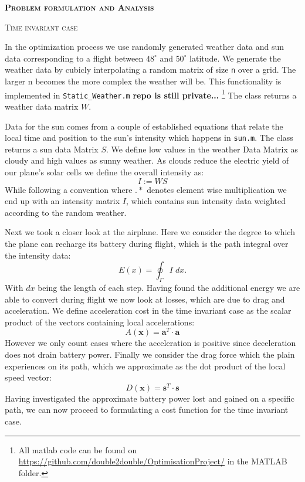 \documentclass[10pt,a4paper]{article}
\newenvironment{buik}
{\begin{multicols}{3}}
{\end{multicols}}
\renewcommand{\section}[1]{%
    \par\vspace{.3cm}\noindent\textbf{\textsc{#1}}%
    \par\noindent\ignorespaces%
}
\renewcommand{\subsection}[1]{%
    \par\vspace{.3cm}\noindent\textsc{#1}%
    \par\noindent\ignorespaces%
}
\begin{document}
\begin{buik}
\section{Problem formulation and Analysis}
\subsection{Time invariant case}
In the optimization process we use randomly generated weather data and sun data corresponding to a flight between $48^\circ$ and $50^\circ$ latitude. We generate the weather data by cubicly interpolating a random matrix of size \texttt{n} over a grid. The larger n becomes the more complex the weather will be. This functionality is implemented in \texttt{Static\_Weather.m} \textbf{repo is still private...} \footnote{All matlab code can be found on \url{https://github.com/double2double/OptimisationProject/} in the MATLAB folder.} The class returns a weather data matrix $W$.

Data for the sun comes from a couple of established equations that relate the local time and position to the sun's intensity  which happens in \texttt{sun.m}. The class returns a sun data Matrix $S$. We define low values in the weather Data Matrix as cloudy and high values as sunny weather. As clouds reduce the electric yield of our plane's solar cells we define the overall intensity as:
\begin{equation}
I:= WS
\end{equation}
While following a convention where $.*$ denotes element wise multiplication we end up with an intensity matrix $I$, which contains sun intensity data weighted according to the random weather.

Next we took a closer look at the airplane. Here we consider the degree to which the plane can recharge its battery during flight, which is the path integral over the intensity data:
\begin{equation}
E(x) = \oint_{\Gamma} I  \; dx.
\end{equation}
With $dx$ being the length of each step. Having found the additional energy we are able to convert during flight we now look at losses, which are due to drag and acceleration. We define acceleration cost in the time invariant case as the scalar product of the vectors containing local accelerations:
\begin{equation}
A(\mathbf{x}) = \mathbf{a}^T \cdot \mathbf{a}
\end{equation}
 However we only count cases where the acceleration is positive since deceleration does not drain battery power.
Finally we consider the drag force which the plain experiences on its path, which we approximate as the dot product of the local speed vector:
\begin{equation}
D(\mathbf{x}) = \mathbf{s}^T \cdot \mathbf{s}
\end{equation}
Having investigated the approximate battery power lost and gained on a specific path, we can now proceed to formulating a cost function for the time invariant case.


\end{buik}
\end{document}
